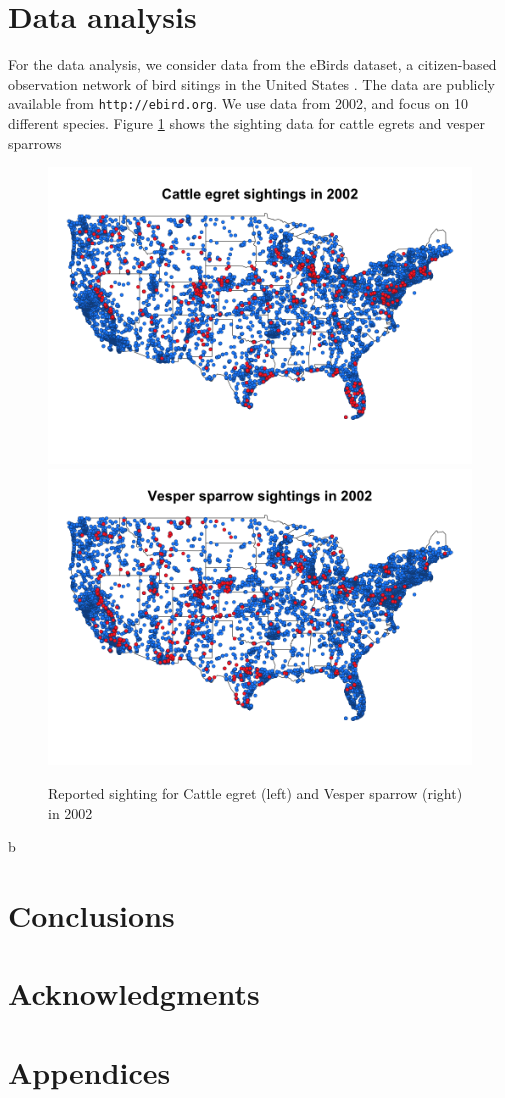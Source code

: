 \documentclass[11pt]{article}
\begin{document}
\section{Data analysis}\label{s:analysis}
For the data analysis, we consider data from the eBirds dataset, a citizen-based observation network of bird sitings in the United States \citep{Sullivan2009}.
The data are publicly available from {\tt http://ebird.org}.
We use data from 2002, and focus on 10 different species.
Figure \ref{fig:data2002} shows the sighting data for cattle egrets and vesper sparrows

\begin{figure}
  \centering
  \includegraphics[width=0.47\linewidth]{plots/cattle_egret.png}
  \includegraphics[width=0.47\linewidth]{plots/vesper_sparrow.png}
  \caption{Reported sighting for Cattle egret (left) and Vesper sparrow (right) in 2002}
  \label{fig:data2002}
\end{figure}b

\section{Conclusions}\label{s:con}

\section*{Acknowledgments}

\appendix
\section{Appendices}
\end{document}
